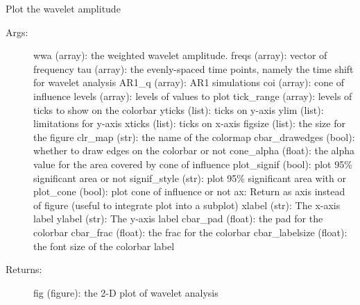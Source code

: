 \documentclass[letterpaper,10pt,english]{sphinxmanual}
\begin{document}

\begin{fulllineitems}
\label{\detokenize{Spectral:pyleoclim.Spectral.plot_wwa}}
Plot the wavelet amplitude
\begin{description}
\item[{Args:}] \leavevmode
wwa (array): the weighted wavelet amplitude.
freqs (array): vector of frequency
tau (array): the evenly-spaced time points, namely the time shift for wavelet analysis
AR1\_q (array): AR1 simulations
coi (array): cone of influence
levels (array): levels of values to plot
tick\_range (array): levels of ticks to show on the colorbar
yticks (list): ticks on y-axis
ylim (list): limitations for y-axis
xticks (list): ticks on x-axis
figsize (list): the size for the figure
clr\_map (str): the name of the colormap
cbar\_drawedges (bool): whether to draw edges on the colorbar or not
cone\_alpha (float): the alpha value for the area covered by cone of influence
plot\_signif (bool): plot 95\% significant area or not
signif\_style (str): plot 95\% significant area with  or 
plot\_cone (bool): plot cone of influence or not
ax: Return as axis instead of figure (useful to integrate plot into a subplot)
xlabel (str): The x-axis label
ylabel (str): The y-axis label
cbar\_pad (float): the pad for the colorbar
cbar\_frac (float): the frac for the colorbar
cbar\_labelsize (float): the font size of the colorbar label

\item[{Returns:}] \leavevmode
fig (figure): the 2-D plot of wavelet analysis

\end{description}

\end{fulllineitems}

\end{document}
